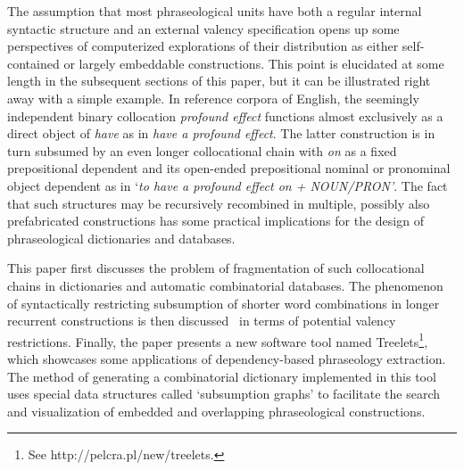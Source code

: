 \documentclass[12pt]{article}
\newenvironment{styleStandard}{\setlength\leftskip{0cm}\setlength\rightskip{0cm plus 1fil}\setlength\parindent{0cm}\setlength\parfillskip{0pt plus 1fil}\setlength\parskip{0in plus 1pt}\writerlistparindent\writerlistleftskip\leavevmode\normalfont\normalsize\writerlistlabel\ignorespaces}{\unskip\vspace{0.111in plus 0.0111in}\par}
\newcommand\writerlistleftskip{}
\newcommand\writerlistparindent{}
\newcommand\writerlistlabel{}
\begin{document}
\begin{styleStandard}
The assumption that most phraseological units have both a regular internal syntactic structure and an external valency specification opens up some perspectives of computerized explorations of their distribution as either self-contained or largely embeddable constructions. This point is elucidated at some length in the subsequent sections of this paper, but it can be illustrated right away with a simple example. In reference corpora of English, the seemingly independent binary collocation \textit{profound effect} functions almost exclusively as a direct object of \textit{have} as in \textit{have a profound effect}. The latter construction is in turn subsumed by an even longer collocational chain with \textit{on} as a fixed prepositional dependent and its open-ended prepositional nominal or pronominal object dependent as in ‘\textit{to have a profound effect on + NOUN/PRON’}. The fact that such structures may be recursively recombined in multiple, possibly also prefabricated constructions has some practical implications for the design of phraseological dictionaries and databases. 
\end{styleStandard}

\begin{styleStandard}
This paper first discusses the problem of fragmentation of such collocational chains in dictionaries and automatic combinatorial databases. The phenomenon of syntactically restricting subsumption of shorter word combinations in longer recurrent constructions is then discussed \ in terms of potential valency restrictions. Finally, the paper presents a new software tool named Treelets\footnote{ See http://pelcra.pl/new/treelets.}, which showcases some applications of dependency-based phraseology extraction. The method of generating a combinatorial dictionary implemented in this tool uses special data structures called ‘subsumption graphs’ to facilitate the search and visualization of embedded and overlapping phraseological constructions.
\end{styleStandard}
\end{document}
